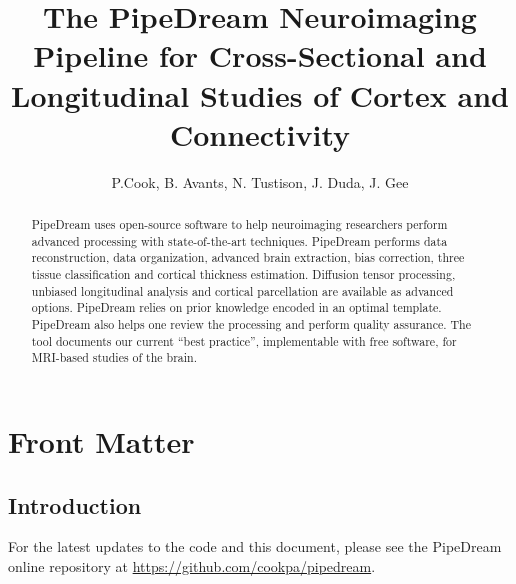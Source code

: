 \documentclass{InsightArticle}
\title{The PipeDream Neuroimaging Pipeline for Cross-Sectional and Longitudinal Studies of Cortex and Connectivity}
\author{P.Cook, B. Avants, N. Tustison, J. Duda, J. Gee}
\begin{document}
%
% 


\ifpdf
\else
\fi


\maketitle


\ifhtml
\chapter*{Front Matter\label{front}}
\fi



\begin{abstract}
\noindent PipeDream uses open-source software to help neuroimaging researchers perform advanced processing with state-of-the-art techniques.  PipeDream performs data reconstruction, data organization, advanced brain extraction, bias correction, three tissue classification and cortical thickness estimation.  Diffusion tensor processing, unbiased longitudinal analysis and cortical parcellation are available as advanced options.  PipeDream relies on prior knowledge encoded in an optimal template.  PipeDream also helps one review the processing and perform quality assurance.  The tool documents our current ``best practice'', implementable with free software, for MRI-based studies of the brain.
\end{abstract}


\tableofcontents
\newpage
\section*{Introduction}

For the latest updates to the code and this document, please see the PipeDream online repository at \url{https://github.com/cookpa/pipedream}. 
\end{document}
